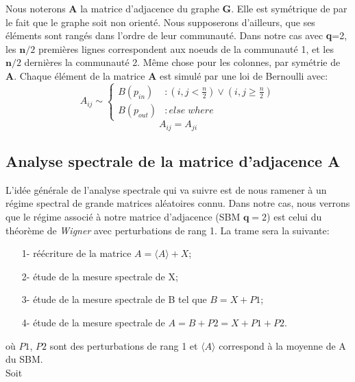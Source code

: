 Nous noterons \textbf{A} la matrice d'adjacence du graphe \textbf{G}.
Elle est symétrique de par le fait que le graphe soit non orienté.
Nous supposerons d'ailleurs, que ses éléments sont rangés dans l'ordre de leur communauté.
Dans notre cas avec \textbf{q}=2, les $\mathbf{n}/2$ premières lignes correspondent aux noeuds de la communauté 1, et les $\mathbf{n}/2$ dernières la communauté 2.
Même chose pour les colonnes, par symétrie de \textbf{A}.
Chaque élément de la matrice \textbf{A} est simulé par une loi de Bernoulli avec: 
\begin{equation} 
 A_{ij} \sim \left\{
  \begin{array}{lr}
    B(p_{in}) & : (i,j < \frac{n}{2}) \lor (i,j \ge \frac{n}{2}) \\
    B(p_{out}) & : else \; where
  \end{array}
\right.\nonumber
\end{equation}
\begin{equation} 
A_{ij} = A_{ji}\nonumber
\end{equation}


\subsection{Analyse spectrale de la matrice d'adjacence \textbf{A}}\label{ch:Analyse spectrale de la matrice d'adjacence}
L'idée générale de l'analyse spectrale qui va suivre est de nous ramener à un régime spectral de grande matrices aléatoires connu. 
Dans notre cas, nous verrons que le régime associé à notre matrice d'adjacence (SBM $\textbf{q}=2$) est celui du théorème de \textit{Wigner} avec perturbations de rang 1.
La trame sera la suivante:
\begin{itemize}
 	\item[1-] réécriture de la matrice $A = \langle A \rangle + X$;
 	\item[2-] étude de la mesure spectrale de X;
 	\item[3-] étude de la mesure spectrale de B tel que $B = X + P1$;
 	\item[4-] étude de la mesure spectrale de $A = B + P2 = X + P1 + P2$.
 \end{itemize} 
où $P1$, $P2$ sont des perturbations de rang 1 et $\langle A \rangle$ correspond à la moyenne de A du SBM.\\

Soit
